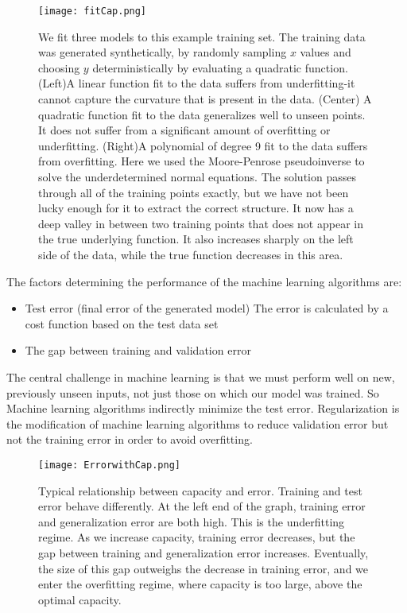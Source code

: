     \begin{figure}[htbp]
        \centering
        \texttt{[image: fitCap.png]}
        \caption{We fit three models to this example training set. The training data was
        generated synthetically, by randomly sampling $x$ values and choosing $y$ deterministically
        by evaluating a quadratic function. (Left)A linear function fit to the data suffers from underfitting-it cannot capture the curvature that is present in the data. (Center) A quadratic function fit to the data generalizes well to unseen points. It does not suffer from a significant amount of overfitting or underfitting. (Right)A polynomial of degree 9 fit to the data suffers from overfitting. Here we used the Moore-Penrose pseudoinverse to solve the underdetermined normal equations. The solution passes through all of the training points exactly, but we have not been lucky enough for it to extract the correct structure. It now has a deep valley in between two training points that does not appear in the true underlying function. It also increases sharply on the left side of the data, while the true function decreases in this area.}
    \end{figure}
    The factors determining the performance of the machine learning algorithms are:
    \begin{itemize}
        \item Test error (final error of the generated model) The error is calculated by a cost function based on the test data set
        \item The gap between training and validation error
    \end{itemize}
    The central challenge in machine learning is that we must perform well on new, previously unseen inputs, not just those on which our model was trained. So Machine learning algorithms indirectly minimize the test error. Regularization is the modification of machine learning algorithms to reduce validation error but not the training error in order to avoid overfitting.
    \begin{figure}[htbp]
        \centering
        \texttt{[image: ErrorwithCap.png]}
        \caption{Typical relationship between capacity and error. Training and test error behave differently. At the left end of the graph, training error and generalization error are both high. This is the underfitting regime. As we increase capacity, training error decreases, but the gap between training and generalization error increases. Eventually, the size of this gap outweighs the decrease in training error, and we enter the overfitting regime, where capacity is too large, above the optimal capacity.}
    \end{figure}
